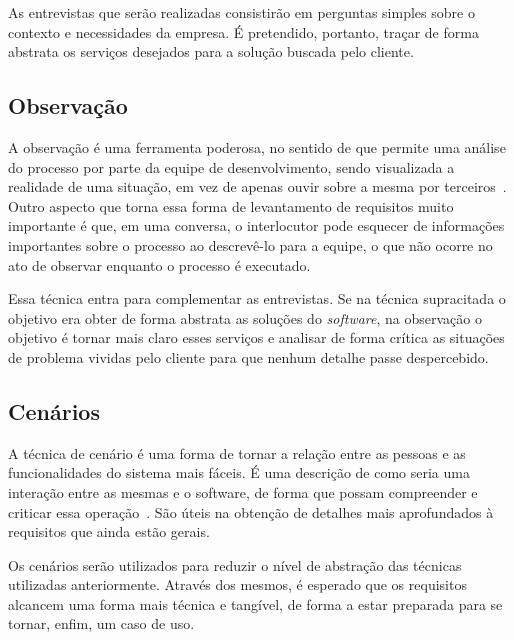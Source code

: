 As entrevistas que serão realizadas consistirão em perguntas simples sobre o contexto e necessidades da empresa. É pretendido, portanto, traçar de forma abstrata os serviços desejados para a solução buscada pelo cliente.

\subsection{Observação}

A observação é uma ferramenta poderosa, no sentido de que permite uma análise do processo por parte da equipe de desenvolvimento, sendo visualizada a realidade de uma situação, em vez de apenas ouvir sobre a mesma por terceiros~\cite{dennis}. Outro aspecto que torna essa forma de levantamento de requisitos muito importante é que, em uma conversa, o interlocutor pode esquecer de informações importantes sobre o processo ao descrevê-lo para a equipe, o que não ocorre no ato de observar enquanto o processo é executado.

Essa técnica entra para complementar as entrevistas. Se na técnica supracitada o objetivo era obter de forma abstrata as soluções do \textit{software}, na observação o objetivo é tornar mais claro esses serviços e analisar de forma crítica as situações de problema vividas pelo cliente para que nenhum detalhe passe despercebido.

\subsection{Cenários}

A técnica de cenário é uma forma de tornar a relação entre as pessoas e as funcionalidades do sistema mais fáceis. É uma descrição de como seria uma interação entre as mesmas e o software, de forma que possam compreender e criticar essa operação~\cite{sommerville}. São úteis na obtenção de detalhes mais aprofundados à requisitos que ainda estão gerais.

Os cenários serão utilizados para reduzir o nível de abstração das técnicas utilizadas anteriormente. Através dos mesmos, é esperado que os requisitos alcancem uma forma mais técnica e tangível, de forma a estar preparada para se tornar, enfim, um caso de uso.
